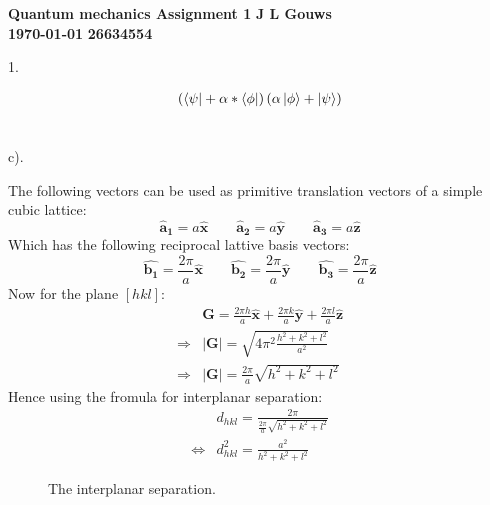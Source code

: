 \documentclass[a4paper,12pt]{article}
\newcommand\block[1]{\hspace*{#1}}
\newcommand{\af}{\pmb{\hat a_1}}
\newcommand{\as}{\pmb{\hat a_2}}
\newcommand{\at}{\pmb{\hat a_3}}
\newcommand\uv[1]{\pmb{\hat {#1}}}
\begin{document}
\selectfont
{\Large \textbf{Quantum mechanics Assignment 1}} \hfill {\Large \textbf{J L Gouws}}\\
\block{1.0cm} {\large \textbf{\today}} \hfill {\large \textbf{26634554}}\\
\thispagestyle{empty}

1.
\begin{minipage}[t]{0.9\textwidth}
  \begin{align*}
    \left(\bra{\psi} + \alpha* \bra{\phi}\right)\left(\alpha \ket{\phi} + \ket{\psi}\right)
  \end{align*}
\end{minipage}
$\phantom{1.}$
\begin{minipage}[t]{0.9\textwidth}
  c).
  \begin{minipage}[t]{\textwidth}
    The following vectors can be used as primitive translation vectors of a simple cubic lattice:
    \begin{equation*}
      \af = a \uv{x} \qquad \as = a \uv{y} \qquad \at = a \uv{z}
    \end{equation*}
    Which has the following reciprocal lattive basis vectors:
    \begin{equation*}
      \uv{b_1} = \frac{2 \pi}{a} \uv{x} \qquad \uv{b_2} = \frac{2 \pi}{a} \uv{y} \qquad \uv{b_3} =  \frac{2 \pi}{a}\uv{z}
    \end{equation*}
    Now for the plane $[hkl]$:
    \begin{align*}
                  & \pmb{G} = \frac{2 \pi h}{a} \uv{x} + \frac{2 \pi k}{a} \uv{y} + \frac{2 \pi l}{a} \uv{z}\\
      \Rightarrow & \left| \pmb{G} \right| = \sqrt{4 \pi^2 \frac{h^2 + k^2 + l^2}{a^2}}\\
      \Rightarrow & \left| \pmb{G} \right| = \frac{2 \pi}{a} \sqrt{h^2 + k^2 + l^2}
    \end{align*}
    Hence using the fromula for interplanar separation:
    \begin{align*}
                      & d_{hkl} = \frac{2 \pi}{\frac{2 \pi}{a} \sqrt{h^2 + k^2 + l^2}}\\
      \Leftrightarrow & d^2_{hkl} = \frac{a^2}{h^2 + k^2 + l^2}
    \end{align*}
  \end{minipage}
\end{minipage}
  \begin{figure}
  \centering
  \caption{The interplanar separation.}
  \label{fig:planeSep}
\end{figure}
\end{document}
